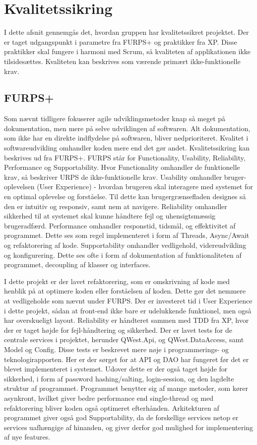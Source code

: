 \chapter{Kvalitetssikring}\label{ch:Kvalitetssikring}

I dette afsnit gennemgås det, hvordan gruppen har kvalitetssikret projektet. Der er taget udgangspunkt i parametre fra FURPS+\cite{furps} og praktikker fra XP. Disse praktikker skal fungere i harmoni med Scrum, så kvaliteten af applikationen ikke tilsidesættes. Kvaliteten kan beskrives som værende primært ikke-funktionelle krav.

\section{FURPS+}
Som nævnt tidligere fokuserer agile udviklingsmetoder knap så meget på dokumentation, men mere på selve udviklingen af softwaren. Alt dokumentation, som ikke har en direkte indflydelse på softwaren, bliver nedprioriteret. Kvalitet i softwareudvikling omhandler koden mere end det gør andet. Kvalitetssikring kan beskrives ud fra FURPS+. FURPS står for Functionality, Usability, Reliability, Performance og Supportability. Hvor Functionality omhandler de funktionelle krav, så beskriver URPS de ikke-funktionelle krav. 
Usability omhandler bruger-oplevelsen (User Experience) - hvordan brugeren skal interagere med systemet for en optimal oplevelse og forståelse. Til dette kan brugergrænsefladen designes så den er intuitiv og responsiv, samt nem at navigere. 
Reliability omhandler sikkerhed til at systemet skal kunne håndtere fejl og uhensigtsmæssig brugeradfærd.
Performance omhandler responstid, tidsmål, og effektivitet af programmet. Dette ses som regel implementeret i form af Threads, Async/Await og refaktorering af kode.
Supportability omhandler vedligehold, videreudvikling og konfigurering. Dette ses ofte i form af dokumentation af funktionaliteten af programmet, decoupling af klasser og interfaces.

I dette projekt er der lavet refaktorering, som er omskrivning af kode med henblik på at optimere koden eller forståelsen af koden. Dette gør det nemmere at vedligeholde som nævnt under FURPS. 
Der er investeret tid i User Experience i dette projekt, sådan at front-end ikke bare er udelukkende funktionel, men også har overskueligt layout. Reliability er håndteret sammen med TDD fra XP, hvor der er taget højde for fejl-håndtering og sikkerhed. Der er lavet tests for de centrale services i projektet, herunder QWest.Api, og QWest.DataAccess, samt Model og Config. Disse tests er beskrevet mere nøje i programmerings- og teknologirapporten. Her er der sørget for at API og DAO har fungeret før det er blevet implementeret i systemet. Udover dette er der også taget højde for sikkerhed, i form af password hashing/salting, login-session, og den lagdelte struktur af programmet.
Programmet benytter sig af mange metoder, som kører asynkront, hvilket giver bedre performance end single-thread og med refaktorering bliver koden også optimeret efterhånden. Arkitekturen af programmet giver også god Supportability, da de forskellige services netop er services uafhængige af hinanden, og giver derfor god mulighed for implementering af nye features.

